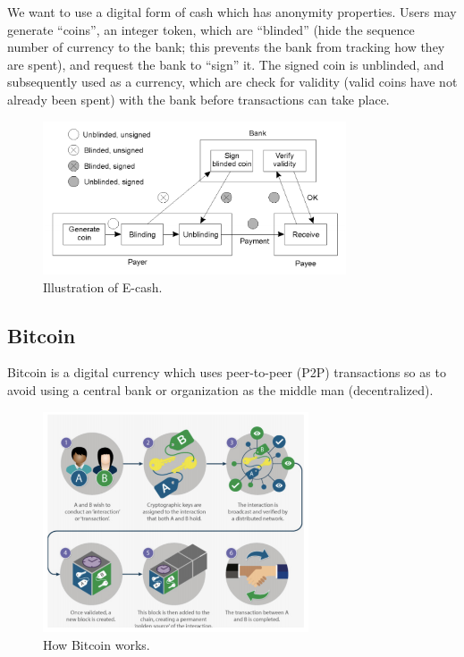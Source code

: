 \documentclass[twoside]{article}
\begin{document}
We want to use a digital form of cash which has anonymity properties. Users may generate ``coins'', an integer token, which are ``blinded'' (hide the sequence number of currency to the bank; this prevents the bank from tracking how they are spent), and request the bank to ``sign'' it. The signed coin is unblinded, and subsequently used as a currency, which are check for validity (valid coins have not already been spent) with the bank before transactions can take place.

\begin{figure}[H]
\centering
\includegraphics[width=0.8\textwidth]{ecash.png}
\caption{Illustration of E-cash.}
\end{figure}

\subsection{Bitcoin}

Bitcoin is a digital currency which uses peer-to-peer (P2P) transactions so as to avoid using a central bank or organization as the middle man (decentralized).

\begin{figure}[H]
\centering
\includegraphics[width=0.7\textwidth]{bitcoin.png}
\caption{How Bitcoin works.}
\end{figure}
\end{document}
